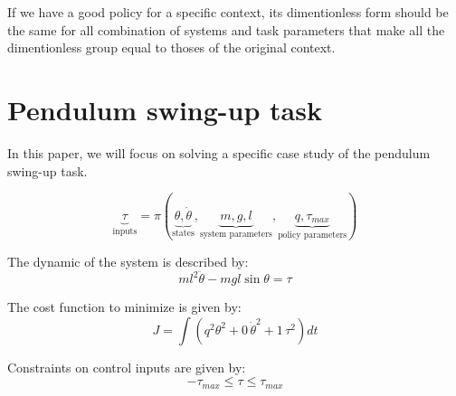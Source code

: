 If we have a good policy for a specific context, its dimentionless form should be the same for all combination of systems and task parameters that make all the dimentionless group equal to thoses of the original context. 


\newpage
\section{Pendulum swing-up task}
In this paper, we will focus on solving a specific case study of the pendulum swing-up task. 

\begin{equation}
\underbrace{\tau}_{\text{inputs}}
=
\pi \left(
\underbrace{ \theta, \dot{\theta} }_{\text{states}},
\underbrace{ m , g , l }_{\text{system parameters}},
\underbrace{ q , \tau_{max} }_{\text{policy parameters}}
\right)
\end{equation}

The dynamic of the system is described by:
\begin{equation}
ml^2 \ddot{\theta} - mgl \sin \theta = \tau
\end{equation}

The cost function to minimize is given by:
\begin{equation}
J = \int{( q^2 \theta^2 + 0 \, \dot{\theta}^2 + 1 \, \tau^2 ) dt }
\end{equation}

Constraints on control inputs are given by:
\begin{equation}
- \tau_{max} \leq \tau \leq \tau_{max}
\end{equation}

